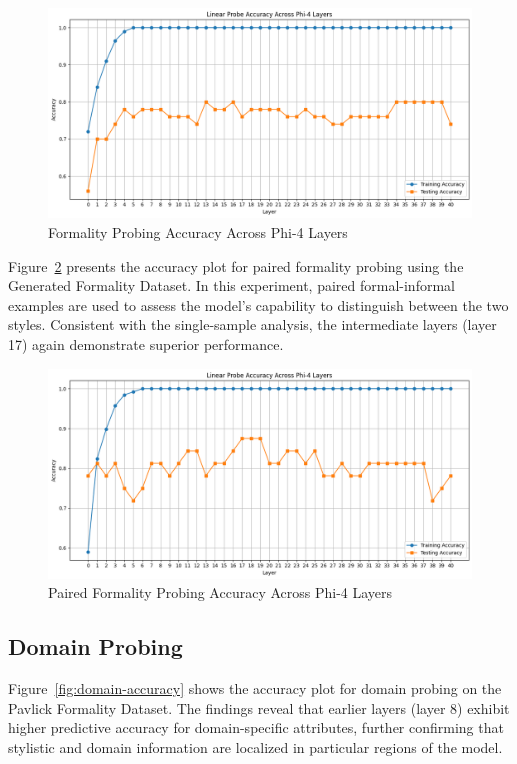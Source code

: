 \documentclass{article}
\begin{document}
\begin{figure}
    \centering
    \includegraphics[width=1.0\textwidth]{figures/1_formality.png}
    \caption{Formality Probing Accuracy Across Phi-4 Layers}
    \label{fig:formality-accuracy}
\end{figure}

Figure~\ref{fig:paired-formality-accuracy} presents the accuracy plot for paired formality probing using the Generated Formality Dataset. In this experiment, paired formal-informal examples are used to assess the model’s capability to distinguish between the two styles. Consistent with the single-sample analysis, the intermediate layers (layer 17) again demonstrate superior performance.

\begin{figure}
    \centering
    \includegraphics[width=1.0\textwidth]{figures/2_pairedFormality.png}
    \caption{Paired Formality Probing Accuracy Across Phi-4 Layers}
    \label{fig:paired-formality-accuracy}
\end{figure}

\subsection{Domain Probing}
Figure~\ref{fig:domain-accuracy} shows the accuracy plot for domain probing on the Pavlick Formality Dataset. The findings reveal that earlier layers (layer 8) exhibit higher predictive accuracy for domain-specific attributes, further confirming that stylistic and domain information are localized in particular regions of the model.
\end{document}
